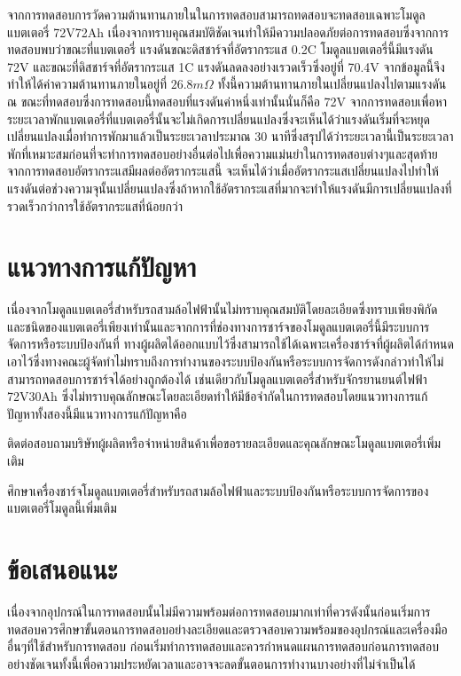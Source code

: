 จากการทดสอบการวัดความต้านทานภายในในการทดสอบสามารถทดสอบจะทดสอบเฉพาะโมดูลแบตเตอรี่ 72V72Ah เนื่องจากทราบคุณสมบัติชัดเจนทำให้มีความปลอดภัยต่อการทดสอบซึ่งจากการทดสอบพบว่าขณะที่แบตเตอรี่
แรงดันขณะดิสชาร์จที่อัตรากระแส 0.2C โมดูลแบตเตอรี่นี้มีแรงดัน 72V และขณะที่ดิสชาร์จที่อัตรากระแส 1C แรงดันลดลงอย่างเรวดเร็วซึ่งอยู่ที่ 70.4V จากข้อมูลนี้จึงทำให้ได้ค่าความต้านทานภายในอยู่ที่
$26.8 m\Omega $ ทั้งนี้ความต้านทานภายในเปลี่ยนแปลงไปตามแรงดัน ณ ขณะที่ทดสอบซึ่งการทดสอบนี้ทดสอบที่แรงดันค่าหนึ่งเท่านั้นนั่นก็คือ 72V
\newline
\hspace*{2cm}
จากการทดสอบเพื่อหาระยะเวลาพักแบตเตอรี่ที่แบตเตอรี่นั้นจะไม่เกิดการเปลี่ยนแปลงซึ่งจะเห็นได้ว่าแรงดันเริ่มที่จะหยุดเปลี่ยนแปลงเมื่อทำการพักมาแล้วเป็นระยะเวลาประมาณ 30 นาทีซึ่งสรุปได้ว่าระยะเวลานี้เป็นระยะเวลาพักที่เหมาะสมก่อนที่จะทำการทดสอบอย่างอื่นต่อไปเพื่อความแม่นยำในการทดสอบต่างๆและสุดท้ายจากการทดสอบอัตรากระแสมีผลต่ออัตรากระแสนี้
จะเห็นได้ว่าเมื่ออัตรากระแสเปลี่ยนแปลงไปทำให้แรงดันต่อช่วงความจุนั้นเปลี่ยนแปลงซึ่งถ้าหากใช้อัตรากระแสที่มากจะทำให้แรงดันมีการเปลี่ยนแปลงที่รวดเร็วกว่าการใช้อัตรากระแสที่น้อยกว่า
\section{แนวทางการแก้ปัญหา}
เนื่องจากโมดูลแบตเตอรี่สำหรับรถสามล้อไฟฟ้านั้นไม่ทราบคุณสมบัติโดยละเอียดซึ่งทราบเพียงพิกัดและชนิดของแบตเตอรี่เพียงเท่านั้นและจากการที่ช่องทางการชาร์จของโมดูลแบตเตอรี่นี้มีระบบการจัดการหรือระบบป้องกันที่
ทางผู้ผลิตได้ออกแบบไว้ซึ่งสามารถใช้ได้เฉพาะเครื่องชาร์จที่ผู้ผลิตได้กำหนดเอาไว้ซึ่งทางคณะผู้จัดทำไม่ทราบถึงการทำงานของระบบป้องกันหรือระบบการจัดการดังกล่าวทำให้ไม่สามารถทดสอบการชาร์จได้อย่างถูกต้องได้
เช่นเดียวกับโมดูลแบตเตอรี่สำหรับจักรยานยนต์ไฟฟ้า 72V30Ah ซึ่งไม่ทราบคุณลักษณะโดยละเอียดทำให้มีข้อจำกัดในการทดสอบโดยแนวทางการแก้ปัญหาทั้งสองนี้มีแนวทางการแก้ปัญหาคือ
\begin{itemize}
{\item ติดต่อสอบถามบริษัทผู้ผลิตหรือจำหน่ายสินค้าเพื่อขอรายละเอียดและคุณลักษณะโมดูลแบตเตอรี่เพิ่มเติม}
{\item ศึกษาเครื่องชาร์จโมดูลแบตเตอรี่สำหรับรถสามล้อไฟฟ้าและระบบป้องกันหรือระบบการจัดการของแบตเตอรี่โมดูลนี้เพิ่มเติม}
\end{itemize}
\section{ข้อเสนอแนะ}
เนื่องจากอุปกรณ์ในการทดสอบนั้นไม่มีความพร้อมต่อการทดสอบมากเท่าที่ควรดังนั้นก่อนเริ่มการทดสอบควรศึกษาขั้นตอนการทดสอบอย่างละเอียดและตรวจสอบความพร้อมของอุปกรณ์และเครื่องมืออื่นๆที่ใช้สำหรับการทดสอบ
ก่อนเริ่มทำการทดสอบและควรกำหนดแผนการทดสอบก่อนการทดสอบอย่างชัดเจนทั้งนี้เพื่อความประหยัดเวลาและอาจจะลดขั้นตอนการทำงานบางอย่างที่ไม่จำเป็นได้












